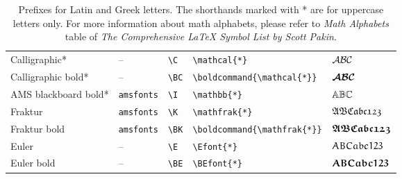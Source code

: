 \documentclass[]{article}
\begin{document}
\begin{table}[htbp]
\begin{tabular}{l l l l l}
    Calligraphic* & -- & \verb+\C+ & \verb+\mathcal{*}+ & ${\mathcal{A}}{\mathcal{B}}{\mathcal{C}}$ \\
    Calligraphic bold* & -- & \verb+\BC+ & \verb+\boldcommand{\mathcal{*}}+ & ${\boldsymbol{\mathcal{A}}}{\boldsymbol{\mathcal{B}}}{\boldsymbol{\mathcal{C}}}$ \\
    AMS blackboard bold* & \texttt{amsfonts} & \verb+\I+ & \verb+\mathbb{*}+ & ${\mathbb{A}}{\mathbb{B}}{\mathbb{C}}$ \\
    Fraktur & \texttt{amsfonts} & \verb+\K+ & \verb+\mathfrak{*}+ & ${\mathfrak{A}}{\mathfrak{B}}{\mathfrak{C}}{\mathfrak{a}}{\mathfrak{b}}{\mathfrak{c}}{\mathfrak{1}}{\mathfrak{2}}{\mathfrak{3}}$\\
    Fraktur bold & \texttt{amsfonts} & \verb+\BK+ & \verb+\boldcommand{\mathfrak{*}}+ & $\boldsymbol{{\mathfrak{A}}}\boldsymbol{{\mathfrak{B}}}\boldsymbol{{\mathfrak{C}}}\boldsymbol{{\mathfrak{a}}}\boldsymbol{{\mathfrak{b}}}\boldsymbol{{\mathfrak{c}}}\boldsymbol{{\mathfrak{1}}}\boldsymbol{{\mathfrak{2}}}\boldsymbol{{\mathfrak{3}}}$\\
    Euler & -- & \verb+\E+ & \verb+\Efont{*}+ & $\EA\EB\EC\Ea\Eb\Ec\Eone\Etwo\Ethree$\\
    Euler bold & -- & \verb+\BE+ & \verb+\BEfont{*}+ & $\BEA\BEB\BEC\BEa\BEb\BEc\BEone\BEtwo\BEthree$\\
    \bottomrule
  \end{tabular}
  \caption{Prefixes for Latin and Greek letters.
    The shorthands marked with * are for uppercase letters only.
    For more information about math
    alphabets, please refer to {\em Math Alphabets} table of
    \emph{The Comprehensive \LaTeX{} Symbol List by Scott Pakin}.
    }
  \label{tb:math}
\end{table}

\end{document}
